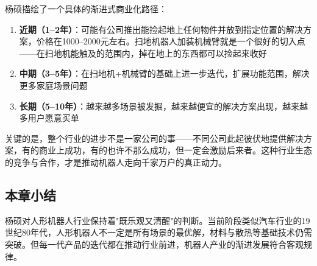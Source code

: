杨硕描绘了一个具体的渐进式商业化路径：

\begin{enumerate}
    \item \textbf{近期（1--2年）}：可能有公司推出能捡起地上任何物件并放到指定位置的解决方案，价格在1000--2000元左右。扫地机器人加装机械臂就是一个很好的切入点——在扫地机能触及的范围内，掉在地上的东西都可以捡起来收好
    \item \textbf{中期（3--5年）}：在扫地机+机械臂的基础上进一步迭代，扩展功能范围，解决更多家庭场景问题
    \item \textbf{长期（5--10年）}：越来越多场景被发掘，越来越便宜的解决方案出现，越来越多用户愿意买单
\end{enumerate}

关键的是，整个行业的进步不是一家公司的事——不同公司此起彼伏地提供解决方案，有的商业上成功，有的也许不那么成功，但一定会激励后来者。这种行业生态的竞争与合作，才是推动机器人走向千家万户的真正动力。

\subsection{本章小结}

杨硕对人形机器人行业保持着"既乐观又清醒"的判断。当前阶段类似汽车行业的19世纪80年代，人形机器人不一定是所有场景的最优解，材料与散热等基础技术仍需突破。但每一代产品的迭代都在推动行业前进，机器人产业的渐进发展符合客观规律。


